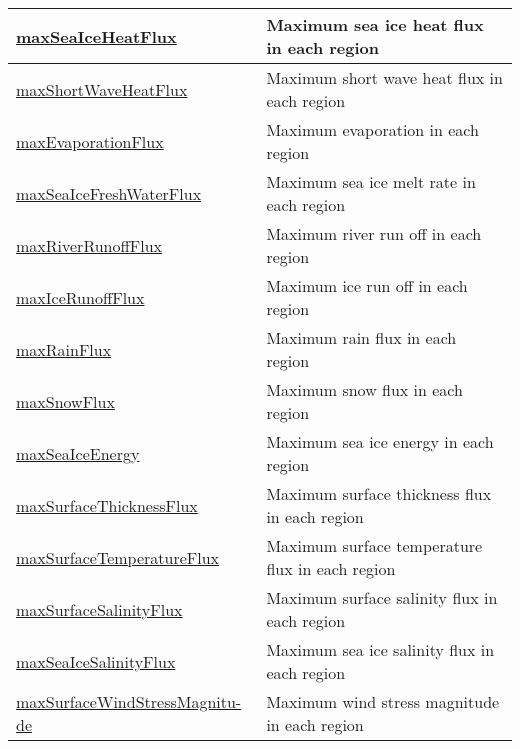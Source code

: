 {\begin{center}
\begin{longtable}{| p{2.0in} | p{4.0in} |}
    \hline
    \hyperref[subsec:var_sec_surfaceAreaWeightedAveragesAM_maxSeaIceHeatFlux]{maxSeaIceHeatFlux} & Maximum sea ice heat flux in each region \\
    \hline
    \hyperref[subsec:var_sec_surfaceAreaWeightedAveragesAM_maxShortWaveHeatFlux]{maxShortWaveHeatFlux} & Maximum short wave heat flux in each region \\
    \hline
    \hyperref[subsec:var_sec_surfaceAreaWeightedAveragesAM_maxEvaporationFlux]{maxEvaporationFlux} & Maximum evaporation in each region \\
    \hline
    \hyperref[subsec:var_sec_surfaceAreaWeightedAveragesAM_maxSeaIceFreshWaterFlux]{maxSeaIceFreshWaterFlux} & Maximum sea ice melt rate in each region \\
    \hline
    \hyperref[subsec:var_sec_surfaceAreaWeightedAveragesAM_maxRiverRunoffFlux]{maxRiverRunoffFlux} & Maximum river run off in each region \\
    \hline
    \hyperref[subsec:var_sec_surfaceAreaWeightedAveragesAM_maxIceRunoffFlux]{maxIceRunoffFlux} & Maximum ice run off in each region \\
    \hline
    \hyperref[subsec:var_sec_surfaceAreaWeightedAveragesAM_maxRainFlux]{maxRainFlux} & Maximum rain flux in each region \\
    \hline
    \hyperref[subsec:var_sec_surfaceAreaWeightedAveragesAM_maxSnowFlux]{maxSnowFlux} & Maximum snow flux in each region \\
    \hline
    \hyperref[subsec:var_sec_surfaceAreaWeightedAveragesAM_maxSeaIceEnergy]{maxSeaIceEnergy} & Maximum sea ice energy in each region \\
    \hline
    \hyperref[subsec:var_sec_surfaceAreaWeightedAveragesAM_maxSurfaceThicknessFlux]{maxSurfaceThicknessFlux} & Maximum surface thickness flux in each region \\
    \hline
    \hyperref[subsec:var_sec_surfaceAreaWeightedAveragesAM_maxSurfaceTemperatureFlux]{maxSurfaceTemperatureFlux} & Maximum surface temperature flux in each region \\
    \hline
    \hyperref[subsec:var_sec_surfaceAreaWeightedAveragesAM_maxSurfaceSalinityFlux]{maxSurfaceSalinityFlux} & Maximum surface salinity flux in each region \\
    \hline
    \hyperref[subsec:var_sec_surfaceAreaWeightedAveragesAM_maxSeaIceSalinityFlux]{maxSeaIceSalinityFlux} & Maximum sea ice salinity flux in each region \\
    \hline
    \hyperref[subsec:var_sec_surfaceAreaWeightedAveragesAM_maxSurfaceWindStressMagnitude]{maxSurfaceWindStressMagnitu-}\hyperref[subsec:var_sec_surfaceAreaWeightedAveragesAM_maxSurfaceWindStressMagnitude]{de}  & Maximum wind stress magnitude in each region \\

\end{longtable}
\end{center}}
